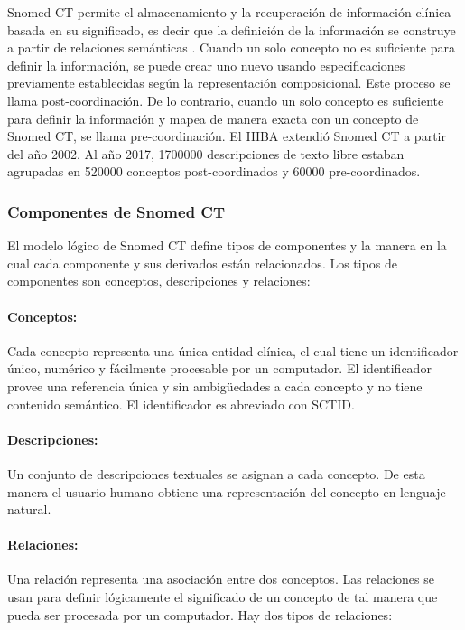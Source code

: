 Snomed CT permite el almacenamiento y la recuperación de información clínica basada en su significado, es decir que la definición de la información se construye a partir de relaciones semánticas \cite{Rector,Bhattacharyya2016,ihtsdo2016SG}. Cuando un solo concepto no es suficiente para definir la información, se puede crear uno nuevo usando  especificaciones previamente establecidas según la representación composicional. Este proceso se llama post-coordinación. De lo contrario, cuando un solo concepto es suficiente para definir la información y mapea de manera exacta con un concepto de Snomed CT, se llama pre-coordinación. El \acrshort{HIBA} extendió Snomed CT a partir del año 2002. Al año \num{2017}, \num{1700000} descripciones de texto libre estaban agrupadas en \num{520000} conceptos post-coordinados y \num{60000} pre-coordinados. 

\subsubsection{Componentes de Snomed CT}
El modelo lógico de Snomed CT define tipos de componentes y la manera en la cual cada componente  y sus derivados están relacionados. Los tipos de componentes son conceptos, descripciones y relaciones:\cite{ihtsdo2016SG}

\paragraph{Conceptos:}
Cada concepto representa una única entidad clínica, el cual tiene un identificador único, numérico y fácilmente procesable por un computador. El identificador provee una referencia única y sin ambigüedades a cada concepto y no tiene contenido semántico. El identificador es abreviado con SCTID.\cite{ihtsdo2016SG}

\paragraph{Descripciones:}
Un conjunto de descripciones textuales se asignan a cada concepto. De esta manera el usuario humano obtiene una representación del concepto en lenguaje natural.

\paragraph{Relaciones:}
Una relación representa una asociación entre dos conceptos. Las relaciones se usan para definir lógicamente el significado de un concepto de tal manera que pueda ser procesada por un computador. Hay dos tipos de relaciones:

